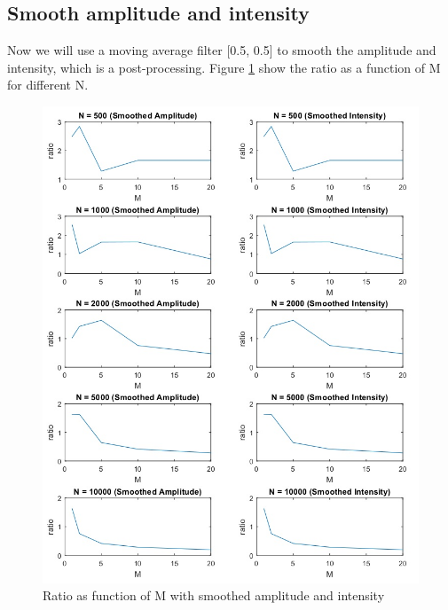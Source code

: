 \documentclass{article}
\begin{document}
\subsection{Smooth amplitude and intensity}
Now we will use a moving average filter [0.5, 0.5] to smooth the amplitude and intensity, which is a post-processing. 
Figure \ref{fig:ratio_smooth_later} show the ratio as a function of M for different N.
\begin{figure}[H]
	\centering
	\includegraphics[width = \textwidth]{src/2pi/ratio_smooth_later.jpg}
	\caption{Ratio as function of M with smoothed amplitude and intensity}
	\label{fig:ratio_smooth_later}
\end{figure}
\end{document}
